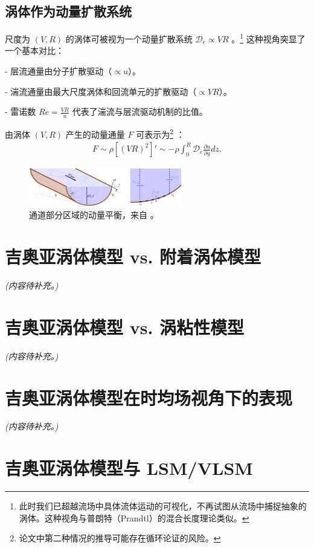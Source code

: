 \documentclass[10pt]{article}
\begin{document}
\subsection{涡体作为动量扩散系统}
尺度为 $(V, R)$ 的涡体可被视为一个动量扩散系统 $\mathcal{D}_e \propto VR$ \cite{ocfjfm2024}。\footnote{此时我们已超越流场中具体流体运动的可视化，不再试图从流场中捕捉抽象的涡体。这种视角与普朗特（Prandtl）的混合长度理论类似。} 这种视角突显了一个基本对比：

    
- 层流通量由分子扩散驱动（$\propto 
u$）。
    
- 湍流通量由最大尺度涡体和回流单元的扩散驱动（$\propto VR$）。
    
- 雷诺数 $Re = \frac{VR}{
u}$ 代表了湍流与层流驱动机制的比值。

由涡体 $(V, R)$ 产生的动量通量 $F$ 可表示为\footnote{论文中第二种情况的推导可能存在循环论证的风险。} \cite{ocfjfm2024}：
\begin{align*}
    F \sim \rho \left[ (VR)^2 \right] '\sim -\rho \int_0^{R}  \mathcal{D}_e \frac{\partial u}{\partial y} dz
.\end{align*}
\begin{figure}[ht!]
    \centering
    \includegraphics[width=0.6\textwidth]{./figures/momentum-flux.png}
    \caption{通道部分区域的动量平衡，来自 \cite{ocfjfm2024}。}
    \label{fig:-figures-momentum-flux-png}
\end{figure}

\section{吉奥亚涡体模型 vs. 附着涡体模型}
\textit{(内容待补充。)}

\section{吉奥亚涡体模型 vs. 涡粘性模型}
\textit{(内容待补充。)}

\section{吉奥亚涡体模型在时均场视角下的表现}
\textit{(内容待补充。)}

\section{吉奥亚涡体模型与 LSM/VLSM}
\end{document}
